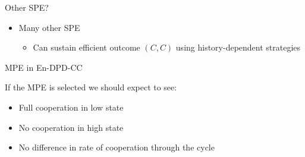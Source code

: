 \documentclass{beamer}
\begin{document}
\begin{frame}{Other SPE?}


\begin{center}
\begin{table}
\centering{}
\end{table}

\par\end{center}
\begin{itemize}
\item Many other SPE

\begin{itemize}
\item Can sustain efficient outcome $(C,C)$ using history-dependent strategies
\end{itemize}
\end{itemize}
\end{frame}


\begin{frame}{MPE in En-DPD-CC}

\begin{card}If the MPE is selected we should expect to see:
		\begin{itemize}
			\item Full cooperation in low state
			\item No cooperation in high state
			\item No difference in rate of cooperation through the cycle
		\end{itemize}
\end{card}
\end{frame}
\end{document}
